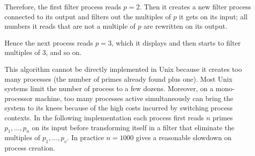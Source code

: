 \begin{myimage}[width="38\%"]
\end{myimage}
%
Therefore, the first filter process reads $p=2$. Then it creates a new
filter process connected to its output and filters out the multiples
of $p$ it gets on its input; all numbers it reads that are not a
multiple of $p$ are rewritten on its output.
%
\begin{myimage}[width="65\%"]
\end{myimage}
%
Hence the next process reads $p=3$, which it displays and then starts
to filter multiples of 3, and so on.
%
\begin{myimage}[width="100\%"]
\end{myimage}
% 
This algorithm cannot be directly implemented in Unix because it
creates too many processes (the number of primes already found plus
one). Most Unix systems limit the number of process to a few dozens.
Moreover, on a mono-processor machine, too many processes active
simultaneously can bring the system to its knees because of the
high costs incurred by switching process contexts. In the following
implementation each process first reads $n$ primes $p_1, \ldots, p_n$
on its input before transforming itself in a filter that eliminate the
multiples of $p_1, \ldots, p_v$. In practice $n = 1000$ gives a
reasonable slowdown on process creation.


